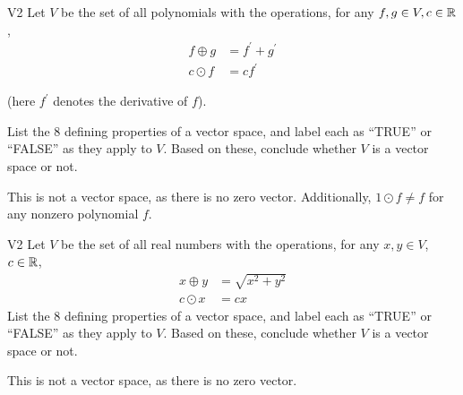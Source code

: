 \begin{problem}{V2}
Let \(V\) be the set of all polynomials with the operations, for any \(f, g \in V,c \in \mathbb{R}\),
\begin{align*}
f \oplus g &= f^\prime + g^\prime \\
c \odot f &= c f^\prime
\end{align*}

(here \(f^\prime\) denotes the derivative of \(f\)).

  List the 8 defining properties of a vector space, and label each as
  ``TRUE'' or ``FALSE'' as they apply to \(V\). Based on these, conclude whether
  \(V\) is a vector space or not.

\end{problem}
\begin{solution}
This is not a vector space, as there is no zero vector.  Additionally, \(1 \odot f \neq f\) for any nonzero polynomial \(f\).
\end{solution}


\begin{problem}{V2}
Let \(V\) be the set of all real numbers with the operations, for any \(x, y \in V\), \(c \in \mathbb{R}\),
\begin{align*}
x \oplus y &= \sqrt{x^2+y^2} \\
c \odot x &= c x
\end{align*}
  List the 8 defining properties of a vector space, and label each as
  ``TRUE'' or ``FALSE'' as they apply to \(V\). Based on these, conclude whether
  \(V\) is a vector space or not.
\end{problem}
\begin{solution}
This is not a vector space, as there is no zero vector.
\end{solution}
